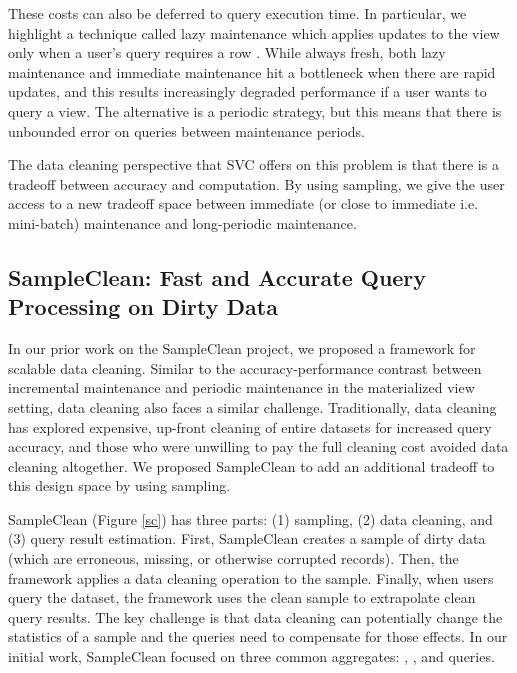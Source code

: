 These costs can also be deferred to query execution time.
In particular, we highlight a technique called lazy maintenance which applies updates to the view only when a user's query requires a row \cite{zhou2007lazy}.
While always fresh, both lazy maintenance and immediate maintenance hit a bottleneck when there are rapid updates, and this results increasingly degraded performance if a user wants to query a view.
The alternative is a periodic strategy, but this means that there is unbounded error on queries between maintenance periods.

The data cleaning perspective that SVC offers on this problem is that there is a tradeoff between accuracy and computation.
By using sampling, we give the user access to a new tradeoff space between immediate (or close to immediate i.e. mini-batch) maintenance and long-periodic maintenance.

\subsection{SampleClean: Fast and Accurate Query Processing on Dirty Data}
In our prior work on the SampleClean project, we proposed a framework for scalable data cleaning.
Similar to the accuracy-performance contrast between incremental maintenance and periodic maintenance in the materialized view setting, data cleaning also faces a similar challenge.
Traditionally, data cleaning has explored expensive, up-front cleaning of entire datasets for increased query accuracy, and those who were unwilling to pay the full cleaning cost avoided data cleaning altogether.
We proposed SampleClean to add an additional tradeoff to this design space by using sampling.

SampleClean (Figure \ref{sc}) has three parts: (1) sampling, (2) data cleaning, and (3) query result estimation.
First, SampleClean creates a sample of dirty data (which are erroneous, missing, or otherwise corrupted records).
Then, the framework applies a data cleaning operation to the sample.
Finally, when users query the dataset, the framework uses the clean sample to extrapolate clean query results.
The key challenge is that data cleaning can potentially change the statistics of a sample and the queries need to compensate for those effects.
In our initial work, SampleClean focused on three common aggregates: \sumfunc, \avgfunc, and \countfunc queries.

